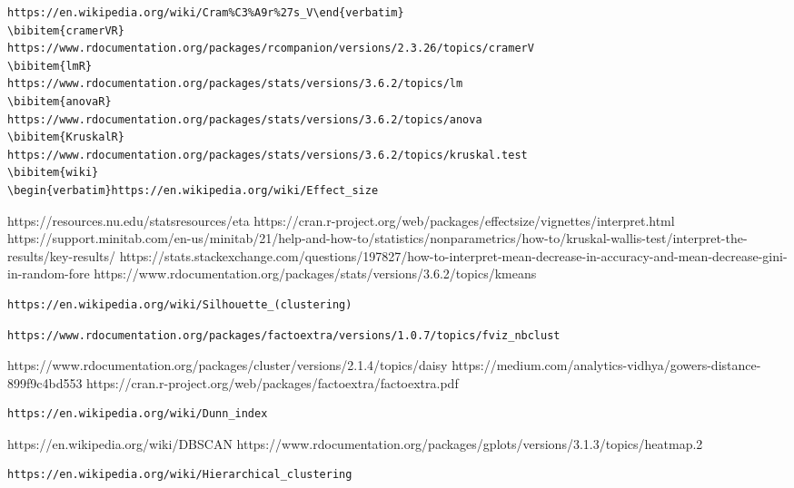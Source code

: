 \documentclass[12pt, a4paper]{article}\usepackage[]{graphicx}\usepackage[]{xcolor}
\begin{document}
%

\begin{thebibliography}{9}
\begin{verbatim}https://en.wikipedia.org/wiki/Cram%C3%A9r%27s_V\end{verbatim}
\bibitem{cramerVR}
https://www.rdocumentation.org/packages/rcompanion/versions/2.3.26/topics/cramerV
\bibitem{lmR}
https://www.rdocumentation.org/packages/stats/versions/3.6.2/topics/lm
\bibitem{anovaR}
https://www.rdocumentation.org/packages/stats/versions/3.6.2/topics/anova
\bibitem{KruskalR}
https://www.rdocumentation.org/packages/stats/versions/3.6.2/topics/kruskal.test
\bibitem{wiki}
\begin{verbatim}https://en.wikipedia.org/wiki/Effect_size\end{verbatim}
https://resources.nu.edu/statsresources/eta
https://cran.r-project.org/web/packages/effectsize/vignettes/interpret.html
https://support.minitab.com/en-us/minitab/21/help-and-how-to/statistics/nonparametrics/how-to/kruskal-wallis-test/interpret-the-results/key-results/
{}
https://stats.stackexchange.com/questions/197827/how-to-interpret-mean-decrease-in-accuracy-and-mean-decrease-gini-in-random-fore
https://www.rdocumentation.org/packages/stats/versions/3.6.2/topics/kmeans
\begin{verbatim}https://en.wikipedia.org/wiki/Silhouette_(clustering)\end{verbatim}
\begin{verbatim}https://www.rdocumentation.org/packages/factoextra/versions/1.0.7/topics/fviz_nbclust\end{verbatim}
https://www.rdocumentation.org/packages/cluster/versions/2.1.4/topics/daisy
https://medium.com/analytics-vidhya/gowers-distance-899f9c4bd553
https://cran.r-project.org/web/packages/factoextra/factoextra.pdf
\begin{verbatim}https://en.wikipedia.org/wiki/Dunn_index\end{verbatim}
https://en.wikipedia.org/wiki/DBSCAN
https://www.rdocumentation.org/packages/gplots/versions/3.1.3/topics/heatmap.2
\begin{verbatim}https://en.wikipedia.org/wiki/Hierarchical_clustering\end{verbatim}

\end{thebibliography}
\end{document}
